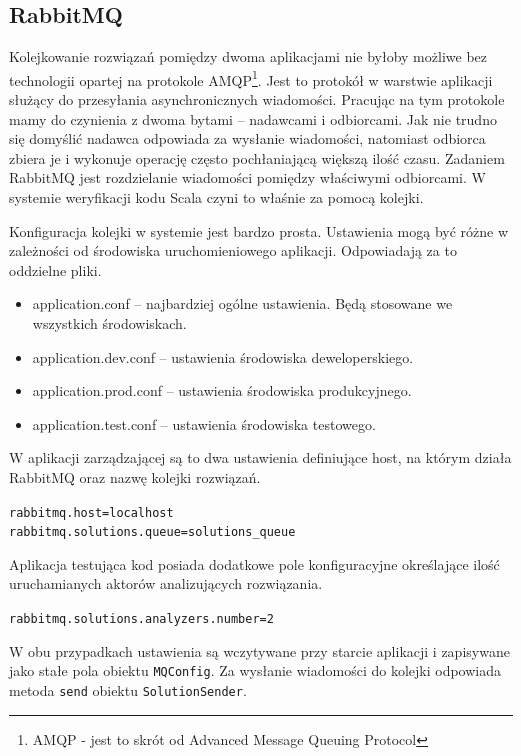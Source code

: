 \documentclass[brudnopis]{xmgr}
\begin{document}
\subsection{RabbitMQ}

Kolejkowanie rozwiązań pomiędzy dwoma aplikacjami nie byłoby możliwe bez technologii opartej na protokole AMQP\footnote{AMQP - jest to skrót od Advanced Message Queuing Protocol}. Jest to protokół w warstwie aplikacji służący do przesyłania asynchronicznych wiadomości. Pracując na tym protokole mamy do czynienia z dwoma bytami -- nadawcami i odbiorcami. Jak nie trudno się domyślić nadawca odpowiada za wysłanie wiadomości, natomiast odbiorca zbiera je i wykonuje operację często pochłaniającą większą ilość czasu. Zadaniem RabbitMQ jest rozdzielanie wiadomości pomiędzy właściwymi odbiorcami. W systemie weryfikacji kodu Scala czyni to właśnie za pomocą kolejki.

Konfiguracja kolejki w systemie jest bardzo prosta. Ustawienia mogą być różne w zależności od środowiska uruchomieniowego aplikacji. Odpowiadają za to oddzielne pliki.

\begin{itemize}
\item application.conf -- najbardziej ogólne ustawienia. Będą stosowane we wszystkich środowiskach.
\item application.dev.conf -- ustawienia środowiska deweloperskiego.
\item application.prod.conf -- ustawienia środowiska produkcyjnego.
\item application.test.conf -- ustawienia środowiska testowego.
\end{itemize} 

W aplikacji zarządzającej są to dwa ustawienia definiujące host, na którym działa RabbitMQ oraz nazwę kolejki rozwiązań.

\begin{alltt}
rabbitmq.host=localhost
rabbitmq.solutions.queue=solutions_queue
\end{alltt}

Aplikacja testująca kod posiada dodatkowe pole konfiguracyjne określające ilość uruchamianych aktorów analizujących rozwiązania.

\begin{alltt}
rabbitmq.solutions.analyzers.number=2
\end{alltt}

W obu przypadkach ustawienia są wczytywane przy starcie aplikacji i zapisywane jako stałe pola obiektu \texttt{MQConfig}. Za wysłanie wiadomości do kolejki odpowiada metoda \texttt{send} obiektu \texttt{SolutionSender}.
\end{document}
